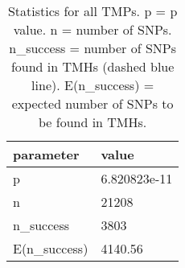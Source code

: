 \begin{table}

\caption{\label{tab:snp_stats}Statistics for all TMPs. p = p value. n = number of SNPs. n\_success = number of SNPs found in TMHs (dashed blue line). E(n\_success) = expected number of SNPs to be found in TMHs. }
\centering
\begin{tabular}[t]{l|l}
\hline
parameter & value\\
\hline
p & 6.820823e-11\\
\hline
n & 21208\\
\hline
n\_success & 3803\\
\hline
E(n\_success) & 4140.56\\
\hline
\end{tabular}
\end{table}

